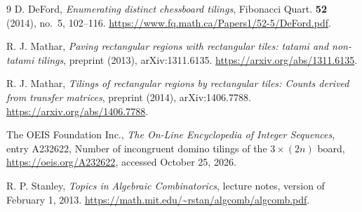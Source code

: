 \begin{thebibliography}{9}
D. DeFord, \emph{Enumerating distinct chessboard tilings},
Fibonacci Quart. \textbf{52} (2014), no.~5, 102--116.
\url{https://www.fq.math.ca/Papers1/52-5/DeFord.pdf}.

R. J. Mathar, \emph{Paving rectangular regions with rectangular
tiles: tatami and non-tatami tilings}, preprint (2013),
arXiv:1311.6135.
\url{https://arxiv.org/abs/1311.6135}.

R. J. Mathar, \emph{Tilings of rectangular regions by rectangular
tiles: Counts derived from transfer matrices}, preprint (2014),
arXiv:1406.7788.
\url{https://arxiv.org/abs/1406.7788}.

The OEIS Foundation Inc., \emph{The On-Line Encyclopedia of
Integer Sequences}, entry A232622,
Number of incongruent domino tilings of the $3\times(2n)$ board,
\url{https://oeis.org/A232622}, accessed October 25, 2026.

R. P. Stanley, \emph{Topics in Algebraic Combinatorics},
lecture notes, version of February 1, 2013.
\url{https://math.mit.edu/~rstan/algcomb/algcomb.pdf}.
\end{thebibliography}
